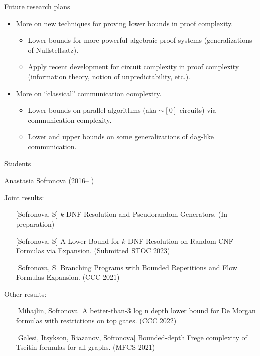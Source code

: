 \begin{frame}{Future research plans}

    \begin{itemize}
        \item More on new techniques for proving lower bounds in proof complexity.
            \begin{itemize}
                \item Lower bounds for more powerful algebraic proof systems (generalizations of
                    Nullstellsatz).
                \item Apply recent development for circuit complexity in proof complexity (information
                    theory, notion of unpredictability, etc.).
            \end{itemize}
        \item More on ``classical'' communication complexity.
            \begin{itemize}
                \item Lower bounds on parallel algorithms (aka $\AC[0]$-circuits) via communication
                    complexity.
                \item Lower and upper bounds on some generalizations of dag-like communication. 
            \end{itemize}
    \end{itemize}
    
\end{frame}


\begin{frame}{Students}

    Anastasia Sofronova (2016-- )

    Joint results:
    \begin{itemize}
        \item[] [Sofronova, S] $k$-DNF Resolution and Pseudorandom Generators. (In preparation)
        \item[] [Sofronova, S] A Lower Bound for $k$-DNF Resolution on Random CNF Formulas via
            Expansion. (\alert{Submitted} STOC 2023)
        \item[] [Sofronova, S] Branching Programs with Bounded Repetitions and Flow Formulas
            Expansion. (CCC 2021)
    \end{itemize}

    \pause
    Other results:
    \begin{itemize}
        \item[] [Mihajlin, Sofronova] A better-than-3 log n depth lower bound for De Morgan formulas with
            restrictions on top gates. (CCC 2022) 
        \item[] [Galesi, Itsykson, Riazanov, Sofronova] Bounded-depth Frege
            complexity of Tseitin formulas for all graphs. (MFCS 2021)
    \end{itemize}
\end{frame}

